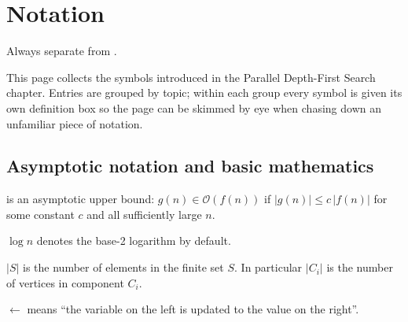 
\chapter*{Notation}


\begin{ppkey}
Always separate  from .
\end{ppkey}

\begin{ppkey}
This page collects the symbols introduced in the Parallel Depth-First
Search chapter.  Entries are grouped by topic; within each group every
symbol is given its own definition box so the page can be skimmed by
eye when chasing down an unfamiliar piece of notation.
\end{ppkey}

\section*{Asymptotic notation and basic mathematics}

\begin{ppdefn}
 is an asymptotic upper bound:
$g(n) \in \mathcal{O}(f(n))$ if $|g(n)| \le c\,|f(n)|$ for some
constant $c$ and all sufficiently large $n$.
\end{ppdefn}

\begin{ppdefn}
 $\log n$ denotes the base-2 logarithm by default.
\end{ppdefn}

\begin{ppdefn}
 $|S|$ is the number of elements in the finite
set $S$.  In particular $|C_i|$ is the number of vertices in
component $C_i$.
\end{ppdefn}

\begin{ppdefn}
 $\leftarrow$ means ``the variable on the left is
updated to the value on the right''.
\end{ppdefn}


